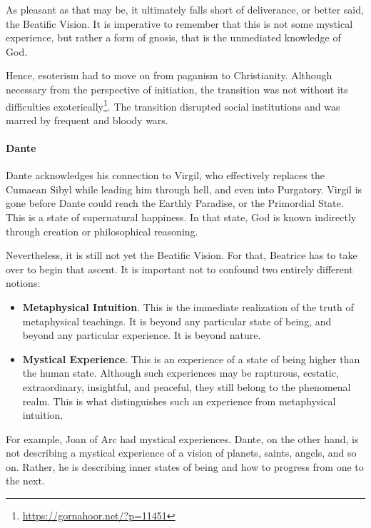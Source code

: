 As pleasant as that may be, it ultimately falls short of deliverance, or better said, the Beatific Vision. It is imperative to remember that this is not some mystical experience, but rather a form of gnosis, that is the unmediated knowledge of God.

Hence, esoterism had to move on from paganism to Christianity. Although necessary from the perspective of initiation, the transition was not without its difficulties exoterically\footnote{\url{https://gornahoor.net/?p=11451}}. The transition disrupted social institutions and was marred by frequent and bloody wars.

\paragraph{Dante}


Dante acknowledges his connection to Virgil, who effectively replaces the Cumaean Sibyl while leading him through hell, and even into Purgatory. Virgil is gone before Dante could reach the Earthly Paradise, or the Primordial State. This is a state of supernatural happiness. In that state, God is known indirectly through creation or philosophical reasoning.

Nevertheless, it is still not yet the Beatific Vision. For that, Beatrice has to take over to begin that ascent. It is important not to confound two entirely different notions:

\begin{itemize}


\item \textbf{Metaphysical Intuition}. This is the immediate realization of the truth of metaphysical teachings. It is beyond any particular state of being, and beyond any particular experience. It is beyond nature.

\item \textbf{Mystical Experience}. This is an experience of a state of being higher than the human state. Although such experiences may be rapturous, ecstatic, extraordinary, insightful, and peaceful, they still belong to the phenomenal realm. This is what distinguishes such an experience from metaphysical intuition.
\end{itemize}


For example, Joan of Arc had mystical experiences. Dante, on the other hand, is not describing a mystical experience of a vision of planets, saints, angels, and so on. Rather, he is describing inner states of being and how to progress from one to the next.

